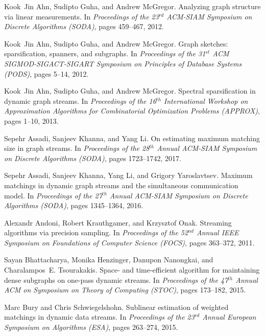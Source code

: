 \documentclass[11pt]{article}
\begin{document}


\newcommand{\etalchar}[1]{$^{#1}$}
\begin{thebibliography}{GMWW14}

Kook~Jin Ahn, Sudipto Guha, and Andrew McGregor.
\newblock Analyzing graph structure via linear measurements.
\newblock In {\em Proceedings of the 23$^{rd}$ {ACM-SIAM} Symposium on Discrete
  Algorithms (SODA)}, pages 459--467, 2012.

Kook~Jin Ahn, Sudipto Guha, and Andrew McGregor.
\newblock Graph sketches: sparsification, spanners, and subgraphs.
\newblock In {\em Proceedings of the 31$^{st}$ {ACM} {SIGMOD-SIGACT-SIGART}
  Symposium on Principles of Database Systems (PODS)}, pages 5--14, 2012.

Kook~Jin Ahn, Sudipto Guha, and Andrew McGregor.
\newblock Spectral sparsification in dynamic graph streams.
\newblock In {\em Proceedings of the 16$^{th}$ International Workshop on
  Approximation Algorithms for Combinatorial Optimization Problems (APPROX)},
  pages 1--10, 2013.

Sepehr Assadi, Sanjeev Khanna, and Yang Li.
\newblock On estimating maximum matching size in graph streams.
\newblock In {\em Proceedings of the 28$^{th}$ Annual {ACM-SIAM} Symposium on
  Discrete Algorithms (SODA)}, pages 1723--1742, 2017.

Sepehr Assadi, Sanjeev Khanna, Yang Li, and Grigory Yaroslavtsev.
\newblock Maximum matchings in dynamic graph streams and the simultaneous
  communication model.
\newblock In {\em Proceedings of the 27$^{th}$ Annual {ACM-SIAM} Symposium on
  Discrete Algorithms (SODA)}, pages 1345--1364, 2016.

Alexandr Andoni, Robert Krauthgamer, and Krzysztof Onak.
\newblock Streaming algorithms via precision sampling.
\newblock In {\em Proceedings of the 52$^{nd}$ Annual IEEE Symposium on
  Foundations of Computer Science (FOCS)}, pages 363--372, 2011.

Sayan Bhattacharya, Monika Henzinger, Danupon Nanongkai, and Charalampos~E.
  Tsourakakis.
\newblock Space- and time-efficient algorithm for maintaining dense subgraphs
  on one-pass dynamic streams.
\newblock In {\em Proceedings of the 47$^{th}$ Annual {ACM} on Symposium on
  Theory of Computing (STOC)}, pages 173--182, 2015.

Marc Bury and Chris Schwiegelshohn.
\newblock Sublinear estimation of weighted matchings in dynamic data streams.
\newblock In {\em Proceedings of the 23$^{rd}$ Annual European Symposium on
  Algorithms (ESA)}, pages 263--274, 2015.


\end{thebibliography}
\end{document}
